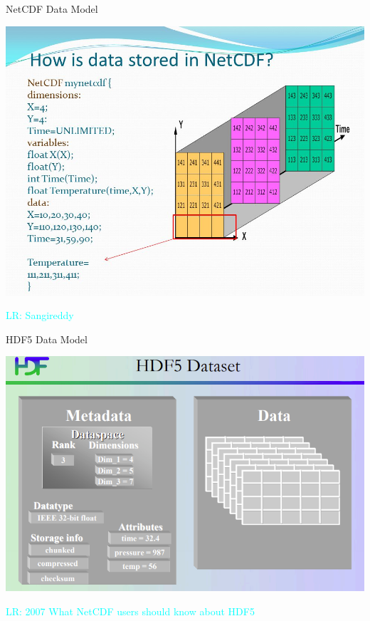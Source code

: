 \documentclass[compress,11pt,xcolor=svgnames,aspectratio=169]{beamer}
\newcommand{\lr}[1]{\textcolor{cyan}{LR: #1}}
\begin{document}
\begin{frame}[t]{NetCDF Data Model}

\begin{center}
\includegraphics[scale=0.4]{fig/netcdf-data}
\end{center}

\lr{Sangireddy}

\end{frame}

\begin{frame}[t]{HDF5 Data Model}

\begin{center}
\includegraphics[scale=0.5]{fig/hdf5-data}
\end{center}

\lr{2007 What NetCDF users should know about HDF5}

\end{frame}
\end{document}
